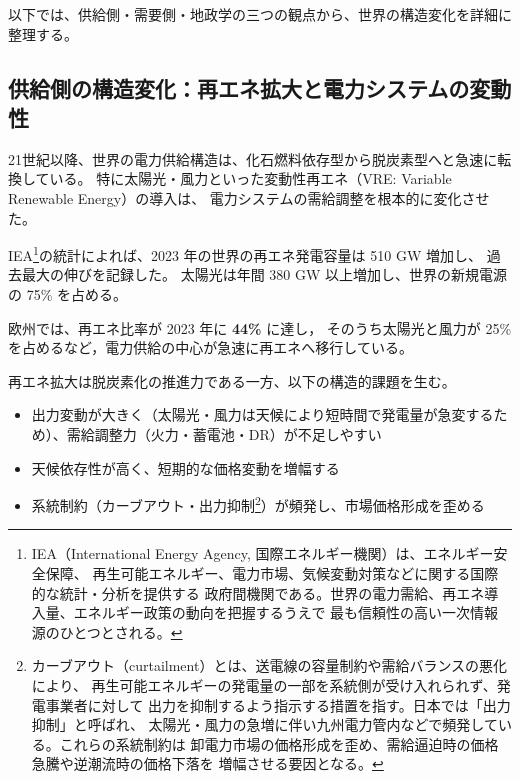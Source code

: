 以下では、供給側・需要側・地政学の三つの観点から、世界の構造変化を詳細に整理する。


\subsection{供給側の構造変化：再エネ拡大と電力システムの変動性}

21世紀以降、世界の電力供給構造は、化石燃料依存型から脱炭素型へと急速に転換している。
特に太陽光・風力といった変動性再エネ（VRE: Variable Renewable Energy）の導入は、
電力システムの需給調整を根本的に変化させた。

IEA\footnote{
IEA（International Energy Agency, 国際エネルギー機関）は、エネルギー安全保障、
再生可能エネルギー、電力市場、気候変動対策などに関する国際的な統計・分析を提供する
政府間機関である。世界の電力需給、再エネ導入量、エネルギー政策の動向を把握するうえで
最も信頼性の高い一次情報源のひとつとされる。
}の統計によれば、2023 年の世界の再エネ発電容量は 510 GW 増加し、
過去最大の伸びを記録した\parencite{IEA2023Renewables}。
太陽光は年間 380 GW 以上増加し、世界の新規電源の 75\% を占める。

欧州では、再エネ比率が 2023 年に \textbf{44\%} に達し，
そのうち太陽光と風力が 25\% を占めるなど，電力供給の中心が急速に再エネへ移行している\parencite{IEAElectricity2024}。

再エネ拡大は脱炭素化の推進力である一方、以下の構造的課題を生む。

\begin{itemize}
  \item 出力変動が大きく（太陽光・風力は天候により短時間で発電量が急変するため）、需給調整力（火力・蓄電池・DR）が不足しやすい    
  \item 天候依存性が高く、短期的な価格変動を増幅する  
  \item 系統制約（カーブアウト・出力抑制\footnote{
  カーブアウト（curtailment）とは、送電線の容量制約や需給バランスの悪化により、
  再生可能エネルギーの発電量の一部を系統側が受け入れられず、発電事業者に対して
  出力を抑制するよう指示する措置を指す。日本では「出力抑制」と呼ばれ、
  太陽光・風力の急増に伴い九州電力管内などで頻発している。これらの系統制約は
  卸電力市場の価格形成を歪め、需給逼迫時の価格急騰や逆潮流時の価格下落を
  増幅させる要因となる。
  }）が頻発し、市場価格形成を歪める  
\end{itemize}

